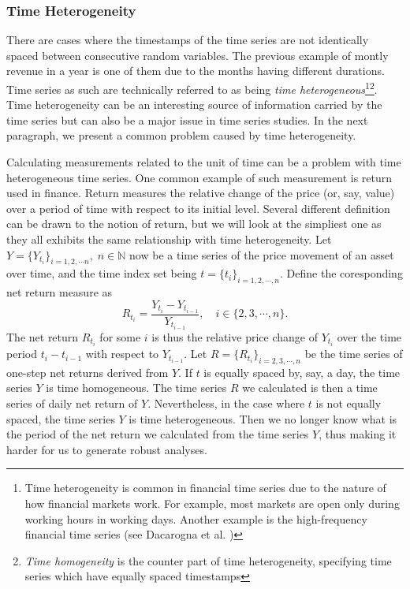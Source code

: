 \subsubsection{Time Heterogeneity}
There are cases where the timestamps of the time series are not identically spaced between consecutive random variables. The previous example of montly revenue in a year is one of them due to the months having different durations. Time series as such are technically referred to as being \textit{time heterogeneous}\footnote{Time heterogeneity is common in financial time series due to the nature of how financial markets work. For example, most markets are open only during working hours in working days. Another example is the high-frequency financial time series (see Dacarogna et al. \citeyear{genccay2001introduction})}\footnote{\textit{Time homogeneity} is the counter part of time heterogeneity, specifying time series which have equally spaced timestamps}. Time heterogeneity can be an interesting source of information carried by the time series but can also be a major issue in time series studies. In the next paragraph, we present a common problem caused by time heterogeneity.

Calculating measurements related to the unit of time can be a problem with time heterogeneous time series. One common example of such measurement is return used in finance. Return measures the relative change of the price (or, say, value) over a period of time with respect to its initial level. Several different definition can be drawn to the notion of return, but we will look at the simpliest one as they all exhibits the same relationship with time heterogeneity. Let $Y = \{ Y_{t_i} \}_{i = 1, 2, \cdots n}, \; n \in \mathbb{N}$ now be a time series of the price movement of an asset over time, and the time index set being $t = \{ t_i \}_{i = 1, 2, \cdots, n}$. Define the coresponding net return measure as
\begin{equation*}
R_{t_i} = \frac{Y_{t_i} - Y_{t_{i-1}}}{Y_{t_{i-1}}}, \quad i \in \{2, 3, \cdots, n \}.
\end{equation*}
The net return $R_{t_i}$ for some $i$ is thus the relative price change of $Y_{t_i}$ over the time period $t_i - t_{i-1}$ with respect to $Y_{t_{i-1}}$. Let $R = \{ R_{t_i} \}_{i = 2, 3, \cdots, n}$ be the time series of one-step net returns derived from $Y$. If $t$ is equally spaced by, say, a day, the time series $Y$ is time homogeneous. The time series $R$ we calculated is then a time series of daily net return of $Y$. Nevertheless, in the case where $t$ is not equally spaced, the time series $Y$ is time heterogeneous. Then we no longer know what is the period of the net return we calculated from the time series $Y$, thus making it harder for us to generate robust analyses.

